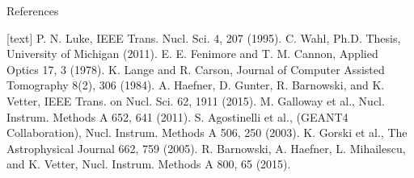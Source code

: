 \documentclass[xcolor=x11names,compress]{beamer}
\renewcommand{\(}{\begin{columns}}
\renewcommand{\)}{\end{columns}}
\newcommand{\<}[1]{\begin{column}{#1}}
\renewcommand{\>}{\end{column}}
\begin{document}
\begin{frame}{References}    
\vspace{-14ex}
\tiny
  \begin{thebibliography}{10}    
  [text]
    P. N. Luke, IEEE Trans. Nucl. Sci. 4, 207 (1995).
   C. Wahl, Ph.D. Thesis, University of Michigan (2011).
   E. E. Fenimore and T. M. Cannon, Applied Optics 17, 3 (1978).
   K. Lange and R. Carson, Journal of Computer Assisted Tomography 8(2), 306 (1984).
   A. Haefner, D. Gunter, R. Barnowski, and K. Vetter, IEEE Trans. on Nucl. Sci. 62, 1911 (2015).
    M. Galloway et al., Nucl. Instrum. Methods A 652, 641 (2011).
   S. Agostinelli et al., (GEANT4 Collaboration), Nucl. Instrum. Methods A 506, 250 (2003).
   K. Gorski et al., The Astrophysical Journal 662, 759 (2005).
   R. Barnowski, A. Haefner, L. Mihailescu, and K. Vetter, Nucl. Instrum. Methods A 800, 65 (2015).
  \end{thebibliography}
\end{frame}
\end{document}
